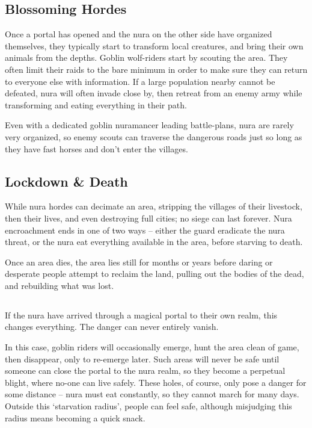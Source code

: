 \begin{multicols}{2}
\subsection{Blossoming Hordes}

Once a portal has opened and the nura on the other side have organized themselves, they typically start to transform local creatures, and bring their own animals from the depths.
Goblin wolf-riders start by scouting the area.
They often limit their raids to the bare minimum in order to make sure they can return to everyone else with information.
If a large population nearby cannot be defeated, nura will often invade close by, then retreat from an enemy army while transforming and eating everything in their path.

Even with a dedicated goblin nuramancer leading battle-plans, nura are rarely very organized, so enemy scouts can traverse the dangerous roads just so long as they have fast horses and don't enter the villages.

\subsection{Lockdown \& Death}

While nura hordes can decimate an area, stripping the villages of their livestock, then their lives, and even destroying full cities; no siege can last forever. 
Nura encroachment ends in one of two ways -- either the \gls{guard} eradicate the nura threat, or the nura eat everything available in the area, before starving to death.

Once an area dies, the area lies still for months or years before daring or desperate people attempt to reclaim the land, pulling out the bodies of the dead, and rebuilding what was lost.

\subsection{}
\label{blight}

If the nura have arrived through a magical portal to their own realm, this changes everything.
The danger can never entirely vanish.

In this case, goblin riders will occasionally emerge, hunt the area clean of game, then disappear, only to re-emerge later.
Such areas will never be safe until someone can close the portal to the nura realm, so they become a perpetual \gls{blight}, where no-one can live safely.
These holes, of course, only pose a danger for some distance -- nura must eat constantly, so they cannot march for many days.
Outside this `starvation radius', people can feel safe, although misjudging this radius means becoming a quick snack.


\end{multicols}
